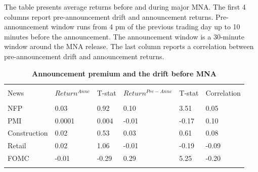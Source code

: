 \documentclass[12pt]{article}
\begin{document}
\begin{table}[!htbp] \centering 
  \caption{\textbf{Announcement premium and the drift before MNA}} 
  \label{}
  \begin{flushleft}
    {\medskip\small
 The table presents average returns before and during major MNA. The first 4 columns report pre-announcement drift and announcement returns. Pre-announcement window runs from 4 pm of the previous trading day up to 10 minutes before the announcement. The announcement window is a 30-minute window around the MNA release. The last column reports a correlation between pre-announcement drift and announcement returns.}
    \medskip
    \end{flushleft}
\begin{tabular}{@{\extracolsep{5pt}} llllll} 
\\[-1.8ex]\hline 
\hline \\[-1.8ex] 
News & $Return^{Annc}$ & T-stat & $Return^{Pre-Annc}$ & T-stat & Correlation \\ 
\hline \\[-1.8ex] 
NFP & 0.03 & 0.92 & 0.10 & 3.51 & 0.05 \\ 
PMI & 0.0001 & 0.004 & -0.01 & -0.17 & 0.10 \\ 
Construction & 0.02 & 0.53 & 0.03 & 0.61 & 0.08 \\ 
Retail & 0.02 & 1.06 & -0.01 & -0.19 & -0.09 \\ 
FOMC & -0.01 & -0.29 & 0.29 & 5.25 & -0.20 \\ 
\hline \\[-1.8ex] 
\end{tabular} 
\end{table} 
\end{document}
